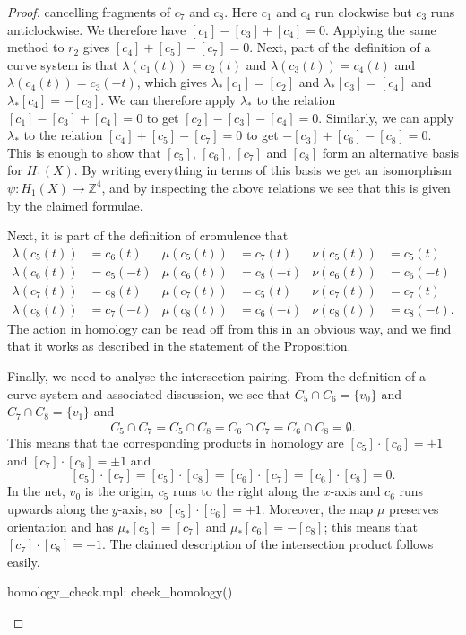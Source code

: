 \documentclass[reqno]{amsart}
\newcommand{\lm}        {\lambda}
\newcommand{\Z}         {{\mathbb{Z}}}
\renewcommand{\:}{\colon}
\theoremstyle{definition}
\begin{document}
\begin{proof}
 cancelling fragments of $c_7$ and $c_8$.  Here $c_1$ and $c_4$ run
 clockwise but $c_3$ runs anticlockwise.  We therefore have
 $[c_1]-[c_3]+[c_4]=0$.  Applying the same method to $r_2$ gives
 $[c_4]+[c_5]-[c_7]=0$.  Next, part of the definition of a curve
 system is that $\lm(c_1(t))=c_2(t)$ and $\lm(c_3(t))=c_4(t)$ and
 $\lm(c_4(t))=c_3(-t)$, which gives $\lm_*[c_1]=[c_2]$ and
 $\lm_*[c_3]=[c_4]$ and $\lm_*[c_4]=-[c_3]$.  We can therefore apply
 $\lm_*$ to the relation $[c_1]-[c_3]+[c_4]=0$ to get
 $[c_2]-[c_3]-[c_4]=0$.  Similarly, we can apply $\lm_*$ to the
 relation $[c_4]+[c_5]-[c_7]=0$ to get $-[c_3]+[c_6]-[c_8]=0$.  This
 is enough to show that $[c_5]$, $[c_6]$, $[c_7]$ and $[c_8]$ form an
 alternative basis for $H_1(X)$.  By writing everything in terms of
 this basis we get an isomorphism $\psi\:H_1(X)\to\Z^4$, and by
 inspecting the above relations we see that this is given by the
 claimed formulae.

 Next, it is part of the definition of cromulence that
 \begin{align*}
  \lm(c_{ 5}(t)) &= c_{ 6}( t)       &
  \mu(c_{ 5}(t)) &= c_{ 7}( t)       &
  \nu(c_{ 5}(t)) &= c_{ 5}( t) \\
  \lm(c_{ 6}(t)) &= c_{ 5}(-t)       &
  \mu(c_{ 6}(t)) &= c_{ 8}(-t)       &
  \nu(c_{ 6}(t)) &= c_{ 6}(-t) \\
  \lm(c_{ 7}(t)) &= c_{ 8}( t)       &
  \mu(c_{ 7}(t)) &= c_{ 5}( t)       &
  \nu(c_{ 7}(t)) &= c_{ 7}( t) \\
  \lm(c_{ 8}(t)) &= c_{ 7}(-t)       &
  \mu(c_{ 8}(t)) &= c_{ 6}(-t)       &
  \nu(c_{ 8}(t)) &= c_{ 8}(-t).
 \end{align*}
 The action in homology can be read off from this in an obvious way,
 and we find that it works as described in the statement of the
 Proposition.

 Finally, we need to analyse the intersection pairing.  From the
 definition of a curve system and associated discussion, we see that
 $C_5\cap C_6=\{v_0\}$ and $C_7\cap C_8=\{v_1\}$ and
 \[ C_5\cap C_7 = C_5\cap C_8 = C_6\cap C_7 = C_6\cap C_8 = \emptyset.
 \]
 This means that the corresponding products in homology are
 $[c_5]\cdot[c_6]=\pm 1$ and $[c_7]\cdot[c_8]=\pm 1$ and
 \[ [c_5]\cdot [c_7] = [c_5]\cdot [c_8] =
    [c_6]\cdot [c_7] = [c_6]\cdot [c_8] = 0.
 \]
 In the net, $v_0$ is the origin, $c_5$ runs to the right along the
 $x$-axis and $c_6$ runs upwards along the $y$-axis, so
 $[c_5]\cdot [c_6]=+1$.  Moreover, the map $\mu$ preserves orientation
 and has $\mu_*[c_5]=[c_7]$ and $\mu_*[c_6]=-[c_8]$; this means that
 $[c_7]\cdot[c_8]=-1$.  The claimed description of the intersection
 product follows easily.

 \begin{checks}
  homology_check.mpl: check_homology()
 \end{checks}
\end{proof}
\end{document}
